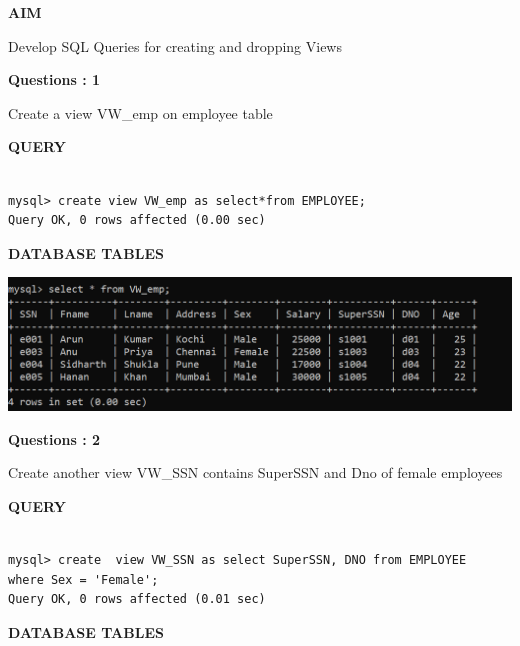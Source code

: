 \documentclass[a4paper,12pt]{report}
\begin{document}
	\begin{flushleft}
		\textbf{AIM }
	\end{flushleft} 
	   Develop SQL Queries for creating and dropping Views

\begin{flushleft}
    \textbf{Questions : 1}
\end{flushleft}
Create a view VW\_emp on employee table
	\begin{flushleft}
		\textbf{QUERY }
	\end{flushleft}
 \begin{verbatim}
 
mysql> create view VW_emp as select*from EMPLOYEE;
Query OK, 0 rows affected (0.00 sec)

\end{verbatim}
\begin{flushleft}
		\textbf{DATABASE TABLES} 
\end{flushleft} 

\includegraphics[scale=0.9]{vmemp.png}

\begin{flushleft}
    \textbf{Questions : 2}
\end{flushleft}
Create another view VW\_SSN contains SuperSSN and Dno of female employees
	\begin{flushleft}
		\textbf{QUERY }
	\end{flushleft}
 \begin{verbatim}
 
mysql> create  view VW_SSN as select SuperSSN, DNO from EMPLOYEE 
where Sex = 'Female';
Query OK, 0 rows affected (0.01 sec)

\end{verbatim}
\begin{flushleft}
		\textbf{DATABASE TABLES} 
\end{flushleft} 
\end{document}
